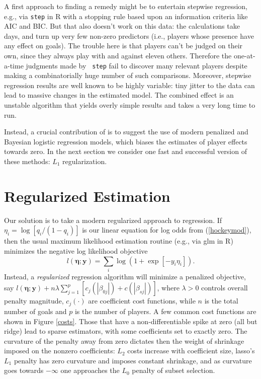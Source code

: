 A first approach to finding a remedy might be to entertain stepwise
regression, e.g., via {\tt step} in {\sf R} with a stopping rule based upon an
information criteria like AIC and BIC.  But that also doesn't work on this
data: the calculations take days, and turn up very few non-zero predictors
(i.e., players whose presence have any effect on goals).  The trouble here is
that players  can't be judged on their own, since they always play with and
against eleven others.  Therefore the one-at-a-time judgments made by {\tt
step} fail to discover many relevant players despite making a combinatorially
huge number of such comparisons.  Moreover, stepwise regression results are
well known to be highly variable: tiny jitter to the data can lead to massive
changes in the estimated model. The combined effect is an unstable algorithm
that yields overly simple results and takes a very long time to run.

Instead, a crucial contribution of
\cite{gramacy:jensen:taddy:2013} is to suggest the use of modern penalized and
Bayesian logistic regression models, which biases the estimates of player
effects towards zero. In the next section we consider one fast and successful version of these methods: $L_1$ regularization.

\section{Regularized Estimation}
\label{sec:regularization}

Our solution is to take a modern regularized approach to regression.  If
$\eta_i = \log[ q_i/(1-q_i) ]$ is our linear equation for log odds from
(\ref{hockeymod}), then the usual maximum likelihood estimation routine (e.g.,
via {\sf glm} in {\sf R}) minimizes the negative log likelihood objective
\begin{equation}\label{eq:nllhd} l\left(\boldsymbol{\eta}; \mathbf{y}\right) =
\sum_i \log\left(1 + \exp[-y_i \eta_i]\right). \end{equation} Instead, a
\textit{regularized} regression algorithm will minimize a penalized objective,
say $ l\left(\boldsymbol{\eta}; \mathbf{y}\right) + n\lambda
\sum_{j=1}^p\left[ c_j\left(|\beta_{0j}|\right) +
c\left(|\beta_{sj}|\right)\right]$, where $\lambda>0$ controls overall penalty
magnitude, $c_j(\cdot)$ are coefficient cost functions, while $n$ is the total
number of goals and $p$ is the number of players.
A few common cost functions are shown in Figure \ref{costs}.  Those that have
a non-differentiable spike at zero (all but ridge) lead to sparse estimators,
with some coefficients set to exactly zero.   The curvature of the penalty
away from zero dictates then the weight of shrinkage imposed on the nonzero
coefficients:  $L_2$ costs increase with coefficient size,  lasso's $L_1$
penalty has zero curvature and imposes constant shrinkage, and as curvature
goes towards $-\infty$ one approaches the $L_0$ penalty of subset selection.

